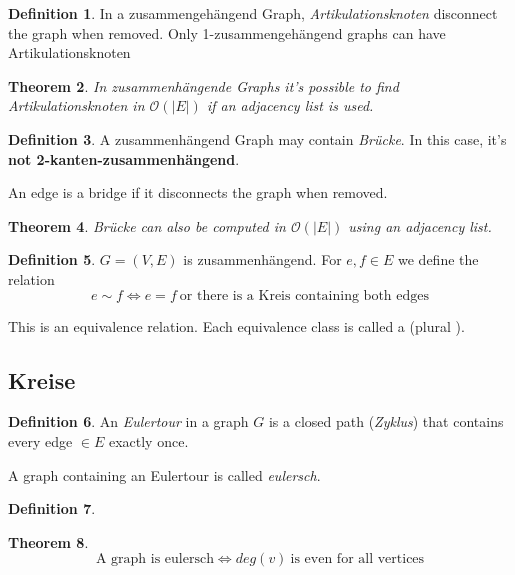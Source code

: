 \documentclass[12pt]{extarticle}
\theoremstyle{definition}
\newtheorem{definition}{Definition}[section]
\theoremstyle{remark}
\theoremstyle{plain}
\newtheorem{theorem}[definition]{Theorem}
\theoremstyle{plain}
\theoremstyle{plain}
\newcommand{\BO}{\mathcal{O}}
\begin{document}
\begin{definition}
    In a zusammengehängend Graph,
    \textit{Artikulationsknoten} disconnect the graph when removed.
    Only 1-zusammengehängend graphs can have Artikulationsknoten
\end{definition}

\begin{theorem}
    In zusammenhängende Graphs it's possible to find Artikulationsknoten in $\BO(|E|)$ if an adjacency list is used.
\end{theorem}

\begin{definition}
    A zusammenhängend Graph may contain \textit{Brücke}. In this case, it's \textbf{not 2-kanten-zusammenhängend}.

    An edge is a bridge if it disconnects the graph when removed.
\end{definition}

\begin{theorem}
    Brücke can also be computed in $\BO(|E|)$ using an adjacency list.
\end{theorem}

\begin{definition}
    $G = (V,E)$ is zusammenhängend. For $e,f \in E$ we define the relation
    \[ e \sim f \Leftrightarrow e = f\ \mbox{or there is a Kreis containing both edges} \]

    This is an equivalence relation. Each equivalence class is called a  (plural ).
\end{definition}

\subsection{Kreise}

\begin{definition}
    An \textit{Eulertour} in a graph $G$ is a closed path (\textit{Zyklus}) that contains every edge $\in E$ exactly once.

    A graph containing an Eulertour is called \textit{eulersch}.
\end{definition}

\begin{definition}

\end{definition}

\begin{theorem}
    \[ \mbox{A graph is eulersch} \Leftrightarrow deg(v)\ \mbox{is even for all vertices}\]
\end{theorem}
\end{document}
